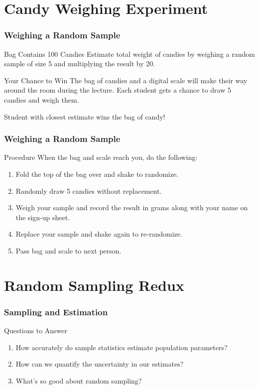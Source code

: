 \section{Candy Weighing Experiment}
\begin{frame}
\frametitle{Weighing a Random Sample}
\begin{block}{Bag Contains 100 Candies}
Estimate total weight of candies by weighing a random sample of size 5 and multiplying the result by 20.
\end{block}
\begin{block}{Your Chance to Win}
The bag of candies and a digital scale will make their way around the room \alert{during the lecture}. Each student gets a chance to draw 5 candies and weigh them.
\end{block}
\begin{alertblock}{Student with closest estimate wins the bag of candy!}
\end{alertblock}

\end{frame}
\begin{frame}
\frametitle{Weighing a Random Sample}
\begin{block}{Procedure}
When the bag and scale reach you, do the following:
\end{block}
\begin{enumerate}
\item Fold the top of the bag over and shake to randomize.
\item Randomly draw 5 candies \alert{without replacement}.
\item Weigh your sample and record the result \alert{in grams} along with your name on the sign-up sheet.
\item Replace your sample and shake again to re-randomize.
\item Pass bag and scale to next person.
\end{enumerate}
\end{frame}


\section{Random Sampling Redux}
\begin{frame}
  \frametitle{Sampling and Estimation}
  \begin{block}{Questions to Answer}
  \begin{enumerate}
    \item How accurately do sample statistics estimate population parameters?
    \item How can we quantify the uncertainty in our estimates?
    \item What's so good about random sampling?
  \end{enumerate}
  \end{block}
\end{frame}

